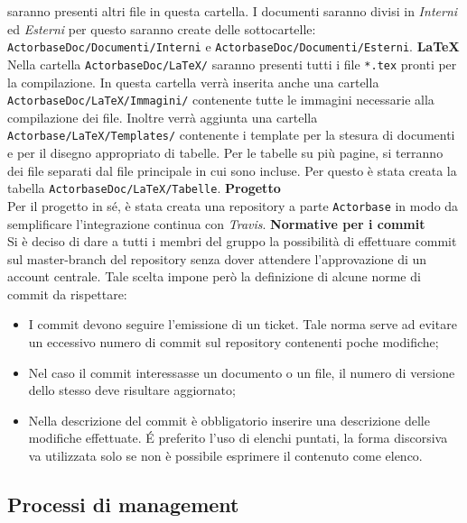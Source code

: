 \documentclass[a4paper]{article}
\begin{document}
	saranno presenti altri file in questa cartella. I documenti saranno divisi in \emph{Interni} ed \emph{Esterni} per questo saranno create 
    delle sottocartelle: \verb|ActorbaseDoc/Documenti/Interni| e \verb|ActorbaseDoc/Documenti/Esterni|.
	\newline
    \textbf{LaTeX} \\
	Nella cartella \verb|ActorbaseDoc/LaTeX/| saranno presenti tutti i file \verb|*.tex| pronti per la compilazione. In questa cartella verrà inserita
	anche una cartella\\ \verb|ActorbaseDoc/LaTeX/Immagini/| contenente tutte le immagini necessarie alla compilazione dei file.
	Inoltre verrà aggiunta una cartella \verb|Actorbase/LaTeX/Templates/| contenente i template per la stesura di documenti e per il
	disegno appropriato di tabelle. 
    Per le tabelle su più pagine, si terranno dei file separati dal file principale in cui sono incluse. Per questo è stata creata la tabella 
    \verb|ActorbaseDoc/LaTeX/Tabelle|.
    \newline
	\textbf{Progetto} \\
    Per il progetto in sé, è stata creata una repository a parte \verb|Actorbase| in modo da semplificare l'integrazione continua con \emph{Travis}.
	\newline
    \textbf{Normative per i commit} \\
		Si è deciso di dare a tutti i membri del gruppo la possibilità di effettuare commit sul master-branch del repository
		senza dover attendere l'approvazione di un account centrale. Tale scelta impone però la definizione di alcune norme
		di commit da rispettare:
		\begin{itemize}
			\item I commit devono seguire l'emissione di un ticket. Tale norma serve ad evitare un eccessivo numero di
			 commit sul repository contenenti poche modifiche;
			\item Nel caso il commit interessasse un documento o un file, il numero di versione dello stesso deve risultare
			 aggiornato;
			\item Nella descrizione del commit è obbligatorio inserire una descrizione delle modifiche effettuate. \'E preferito
			l'uso di elenchi puntati, la forma discorsiva va utilizzata solo se non è possibile esprimere il contenuto come
			elenco.
		\end{itemize}
	\subsection{Processi di management}
\end{document}
